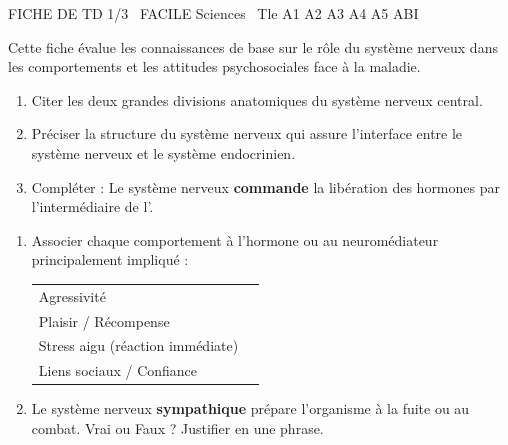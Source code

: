 \documentclass[11pt]{article}
\begin{document}
\begin{tcolorbox}[enhanced,colback=popink,colframe=popink,arc=10pt,boxrule=0pt,left=12pt,right=12pt,top=9pt,bottom=9pt]
{\color{white}\popxbold\small FICHE DE TD 1/3 \textbullet\ FACILE \hfill Sciences \textbullet\ Tle A1 A2 A3 A4 A5 ABI\par}
\end{tcolorbox}
\vspace{4pt}
Cette fiche évalue les connaissances de base sur le rôle du système nerveux dans les comportements et les attitudes psychosociales face à la maladie.

\begin{exercice}
\begin{enumerate}
    \item Citer les deux grandes divisions anatomiques du système nerveux central.
    \item Préciser la structure du système nerveux qui assure l'interface entre le système nerveux et le système endocrinien.
    \item Compléter : Le système nerveux \textbf{commande} la libération des hormones par l'intermédiaire de l'\underline{\hspace{4cm}}.
\end{enumerate}
\end{exercice}

\begin{exercice}
\begin{enumerate}
    \item Associer chaque comportement à l'hormone ou au neuromédiateur principalement impliqué :
    \begin{tabular}{ll}
    Agressivité & \underline{\hspace{3cm}} \\
    Plaisir / Récompense & \underline{\hspace{3cm}} \\
    Stress aigu (réaction immédiate) & \underline{\hspace{3cm}} \\
    Liens sociaux / Confiance & \underline{\hspace{3cm}}
    \end{tabular}
    \item Le système nerveux \textbf{sympathique} prépare l'organisme à la fuite ou au combat. Vrai ou Faux ? Justifier en une phrase.
\end{enumerate}
\end{exercice}
\end{document}

